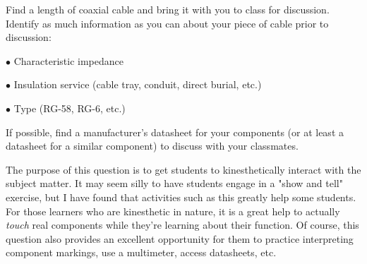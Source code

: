 

Find a length of coaxial cable and bring it with you to class for discussion.  Identify as much information as you can about your piece of cable prior to discussion:

\medskip
\item{$\bullet$} Characteristic impedance
\item{$\bullet$} Insulation service (cable tray, conduit, direct burial, etc.)
\item{$\bullet$} Type (RG-58, RG-6, etc.)
\medskip







If possible, find a manufacturer's datasheet for your components (or at least a datasheet for a similar component) to discuss with your classmates.







The purpose of this question is to get students to kinesthetically interact with the subject matter.  It may seem silly to have students engage in a "show and tell" exercise, but I have found that activities such as this greatly help some students.  For those learners who are kinesthetic in nature, it is a great help to actually {\it touch} real components while they're learning about their function.  Of course, this question also provides an excellent opportunity for them to practice interpreting component markings, use a multimeter, access datasheets, etc.




